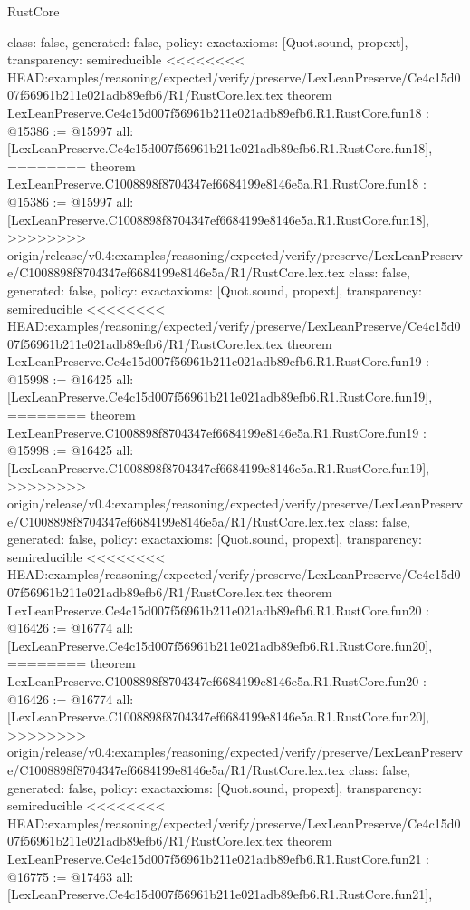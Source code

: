 \begin{lexlean}{RustCore}
\begin{coremodule}
{\begin{coremodule}
{{{{{{{{{{{{{{{{{{{{{  class: false,
  generated: false,
  policy: exact{axioms: [Quot.sound, propext]},
  transparency: semireducible
}
<<<<<<<< HEAD:examples/reasoning/expected/verify/preserve/LexLeanPreserve/Ce4c15d007f56961b211e021adb89efb6/R1/RustCore.lex.tex
theorem LexLeanPreserve.Ce4c15d007f56961b211e021adb89efb6.R1.RustCore.fun18 : @15386 := @15997 {
  all: [LexLeanPreserve.Ce4c15d007f56961b211e021adb89efb6.R1.RustCore.fun18],
========
theorem LexLeanPreserve.C1008898f8704347ef6684199e8146e5a.R1.RustCore.fun18 : @15386 := @15997 {
  all: [LexLeanPreserve.C1008898f8704347ef6684199e8146e5a.R1.RustCore.fun18],
>>>>>>>> origin/release/v0.4:examples/reasoning/expected/verify/preserve/LexLeanPreserve/C1008898f8704347ef6684199e8146e5a/R1/RustCore.lex.tex
  class: false,
  generated: false,
  policy: exact{axioms: [Quot.sound, propext]},
  transparency: semireducible
}
<<<<<<<< HEAD:examples/reasoning/expected/verify/preserve/LexLeanPreserve/Ce4c15d007f56961b211e021adb89efb6/R1/RustCore.lex.tex
theorem LexLeanPreserve.Ce4c15d007f56961b211e021adb89efb6.R1.RustCore.fun19 : @15998 := @16425 {
  all: [LexLeanPreserve.Ce4c15d007f56961b211e021adb89efb6.R1.RustCore.fun19],
========
theorem LexLeanPreserve.C1008898f8704347ef6684199e8146e5a.R1.RustCore.fun19 : @15998 := @16425 {
  all: [LexLeanPreserve.C1008898f8704347ef6684199e8146e5a.R1.RustCore.fun19],
>>>>>>>> origin/release/v0.4:examples/reasoning/expected/verify/preserve/LexLeanPreserve/C1008898f8704347ef6684199e8146e5a/R1/RustCore.lex.tex
  class: false,
  generated: false,
  policy: exact{axioms: [Quot.sound, propext]},
  transparency: semireducible
}
<<<<<<<< HEAD:examples/reasoning/expected/verify/preserve/LexLeanPreserve/Ce4c15d007f56961b211e021adb89efb6/R1/RustCore.lex.tex
theorem LexLeanPreserve.Ce4c15d007f56961b211e021adb89efb6.R1.RustCore.fun20 : @16426 := @16774 {
  all: [LexLeanPreserve.Ce4c15d007f56961b211e021adb89efb6.R1.RustCore.fun20],
========
theorem LexLeanPreserve.C1008898f8704347ef6684199e8146e5a.R1.RustCore.fun20 : @16426 := @16774 {
  all: [LexLeanPreserve.C1008898f8704347ef6684199e8146e5a.R1.RustCore.fun20],
>>>>>>>> origin/release/v0.4:examples/reasoning/expected/verify/preserve/LexLeanPreserve/C1008898f8704347ef6684199e8146e5a/R1/RustCore.lex.tex
  class: false,
  generated: false,
  policy: exact{axioms: [Quot.sound, propext]},
  transparency: semireducible
}
<<<<<<<< HEAD:examples/reasoning/expected/verify/preserve/LexLeanPreserve/Ce4c15d007f56961b211e021adb89efb6/R1/RustCore.lex.tex
theorem LexLeanPreserve.Ce4c15d007f56961b211e021adb89efb6.R1.RustCore.fun21 : @16775 := @17463 {
  all: [LexLeanPreserve.Ce4c15d007f56961b211e021adb89efb6.R1.RustCore.fun21],
}}}}}}}}}}}}}}}}}}}}}}}}
\end{coremodule}}
\end{coremodule}
\end{lexlean}
